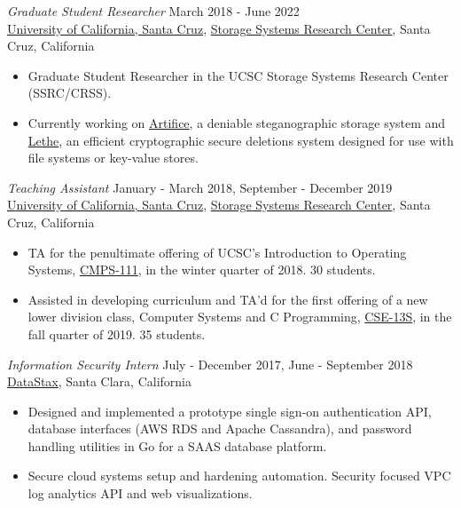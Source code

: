 \documentclass[margin, 10pt]{res} %
\begin{document}
\begin{resume}
{\sl Graduate Student Researcher} \hfill March 2018 - June 2022 \\
\href{http://www.ucsc.edu}{University of California, Santa Cruz}, \href{https://ssrc.ucsc.edu}{Storage Systems Research Center}, Santa Cruz, California
\begin{itemize}
\item Graduate Student Researcher in the UCSC Storage Systems Research Center (SSRC/CRSS).
\item Currently working on \href{https://www.ssrc.ucsc.edu/proj/Artifice.html}{Artifice}, a deniable steganographic storage system and \href{https://www.ssrc.ucsc.edu/proj/securefs.html}{Lethe}, an efficient 
cryptographic secure deletions system designed for use with file systems or key-value stores. 
\end{itemize}

{\sl Teaching Assistant} \hfill January - March 2018, September - December 2019 \\
\href{http://www.ucsc.edu}{University of California, Santa Cruz}, \href{https://ssrc.ucsc.edu}{Storage Systems Research Center}, Santa Cruz, California
\begin{itemize}
\item TA for the penultimate offering of UCSC's Introduction to Operating Systems, \href{https://courses.soe.ucsc.edu/courses/cmps111/}{CMPS-111}, 
in the winter quarter of 2018. 30 students.
\item Assisted in developing curriculum and TA'd for the first offering of a new lower division class, Computer Systems and C Programming, 
\href{https://courses.soe.ucsc.edu/courses/cse13s}{CSE-13S}, in the fall quarter of 2019. 35 students.
\end{itemize}

{\sl Information Security Intern} \hfill July - December 2017, June - September 2018\\
\href{http://www.datastax.com}{DataStax}, Santa Clara, California
\begin{itemize}
\item Designed and implemented a prototype single sign-on authentication API, database interfaces (AWS RDS and Apache Cassandra), and password handling utilities in Go for a SAAS database platform.
\item Secure cloud systems setup and hardening automation. Security focused VPC log analytics API and web visualizations. 
\end{itemize}


\end{resume}
\end{document}
